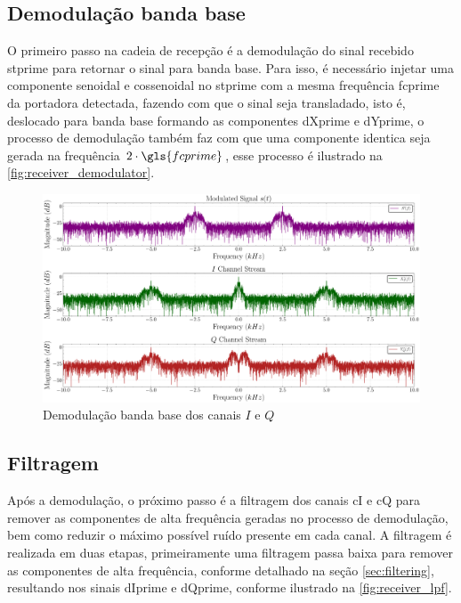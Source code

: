 \subsection{Demodulação banda base}\label{sec:demodulacao}

O primeiro passo na cadeia de recepção é a demodulação do sinal recebido \gls{stprime} para retornar o sinal para banda base. Para isso, é necessário injetar uma componente senoidal e cossenoidal no \gls{stprime} com a mesma frequência \gls{fcprime} da portadora detectada, fazendo com que o sinal seja transladado, isto é, deslocado para banda base formando as componentes \gls{dXprime} e \gls{dYprime}, o processo de demodulação também faz com que uma componente identica seja gerada na frequência $2 \cdot \gls{fcprime}$, esse processo é ilustrado na \autoref{fig:receiver_demodulator}.

\begin{figure}[H]
	\centering
	\caption{Demodulação banda base dos canais $I$ e $Q$}\label{fig:receiver_demodulator}
	\includegraphics[width=\linewidth]{assets/cap3/receiver_demodulator_freq.pdf}
\end{figure}

\subsection{Filtragem}\label{sec:filtragem}

Após a demodulação, o próximo passo é a filtragem dos canais \gls{cI} e \gls{cQ} para remover as componentes de alta frequência geradas no processo de demodulação, bem como reduzir o máximo possível ruído presente em cada canal. A filtragem é realizada em duas etapas, primeiramente uma filtragem passa baixa para remover as componentes de alta frequência, conforme detalhado na seção \ref{sec:filtering}, resultando nos sinais \gls{dIprime} e \gls{dQprime}, conforme ilustrado na \autoref{fig:receiver_lpf}.

